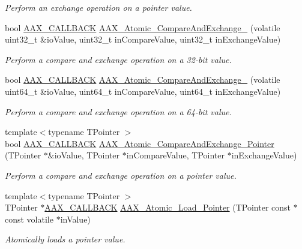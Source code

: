 \begin{DoxyCompactItemize}
\begin{DoxyCompactList}\small\item\em Perform an exchange operation on a pointer value. \end{DoxyCompactList}\item 
bool \hyperlink{a00149_aaa22112139aa627574b1ef562f579d43}{A\+A\+X\+\_\+\+C\+A\+L\+L\+B\+A\+C\+K} \hyperlink{a00159_a74a2bdb895976193bdfe4cd2fe31e21e}{A\+A\+X\+\_\+\+Atomic\+\_\+\+Compare\+And\+Exchange\+\_} (volatile uint32\+\_\+t \&io\+Value, uint32\+\_\+t in\+Compare\+Value, uint32\+\_\+t in\+Exchange\+Value)
\begin{DoxyCompactList}\small\item\em Perform a compare and exchange operation on a 32-\/bit value. \end{DoxyCompactList}\item 
bool \hyperlink{a00149_aaa22112139aa627574b1ef562f579d43}{A\+A\+X\+\_\+\+C\+A\+L\+L\+B\+A\+C\+K} \hyperlink{a00159_ae1e5b0cf8d8c7a301e13772a57a3d2fd}{A\+A\+X\+\_\+\+Atomic\+\_\+\+Compare\+And\+Exchange\+\_} (volatile uint64\+\_\+t \&io\+Value, uint64\+\_\+t in\+Compare\+Value, uint64\+\_\+t in\+Exchange\+Value)
\begin{DoxyCompactList}\small\item\em Perform a compare and exchange operation on a 64-\/bit value. \end{DoxyCompactList}\item 
{\footnotesize template$<$typename T\+Pointer $>$ }\\bool \hyperlink{a00149_aaa22112139aa627574b1ef562f579d43}{A\+A\+X\+\_\+\+C\+A\+L\+L\+B\+A\+C\+K} \hyperlink{a00159_ab1c7611e7c95fd61900b8e5a44c36e63}{A\+A\+X\+\_\+\+Atomic\+\_\+\+Compare\+And\+Exchange\+\_\+\+Pointer} (T\+Pointer $\ast$\&io\+Value, T\+Pointer $\ast$in\+Compare\+Value, T\+Pointer $\ast$in\+Exchange\+Value)
\begin{DoxyCompactList}\small\item\em Perform a compare and exchange operation on a pointer value. \end{DoxyCompactList}\item 
{\footnotesize template$<$typename T\+Pointer $>$ }\\T\+Pointer $\ast$\hyperlink{a00149_aaa22112139aa627574b1ef562f579d43}{A\+A\+X\+\_\+\+C\+A\+L\+L\+B\+A\+C\+K} \hyperlink{a00159_af4fc59eed399acba13a88ca2d46cad92}{A\+A\+X\+\_\+\+Atomic\+\_\+\+Load\+\_\+\+Pointer} (T\+Pointer const $\ast$const volatile $\ast$in\+Value)
\begin{DoxyCompactList}\small\item\em Atomically loads a pointer value. \end{DoxyCompactList}\end{DoxyCompactItemize}


